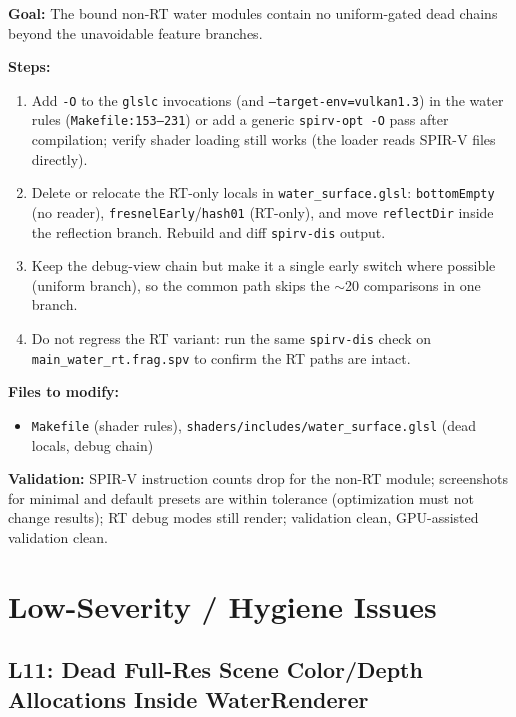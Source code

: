 \documentclass[11pt,a4paper]{article}
\begin{document}
\begin{tcolorbox}[promptbox={Prompt: Optimize the Water Shader Modules and Remove Dead Chains}]
\textbf{Goal:} The bound non-RT water modules contain no uniform-gated dead chains beyond the unavoidable feature branches.

\textbf{Steps:}
\begin{enumerate}
    \item Add \texttt{-O} to the \texttt{glslc} invocations (and \texttt{--target-env=vulkan1.3}) in the water rules (\texttt{Makefile:153--231}) or add a generic
    \texttt{spirv-opt -O} pass after compilation; verify shader loading still works (the loader reads SPIR-V files directly).
    \item Delete or relocate the RT-only locals in \texttt{water\_surface.glsl}: \texttt{bottomEmpty} (no reader), \texttt{fresnelEarly}/\texttt{hash01} (RT-only), and move
    \texttt{reflectDir} inside the reflection branch. Rebuild and diff \texttt{spirv-dis} output.
    \item Keep the debug-view chain but make it a single early switch where possible (uniform branch), so the common path skips the $\sim$20 comparisons in one branch.
    \item Do not regress the RT variant: run the same \texttt{spirv-dis} check on \texttt{main\_water\_rt.frag.spv} to confirm the RT paths are intact.
\end{enumerate}

\textbf{Files to modify:}
\begin{itemize}
    \item \texttt{Makefile} (shader rules), \texttt{shaders/includes/water\_surface.glsl} (dead locals, debug chain)
\end{itemize}

\textbf{Validation:} SPIR-V instruction counts drop for the non-RT module; screenshots for minimal and default presets are within tolerance (optimization must not change
results); RT debug modes still render; validation clean, GPU-assisted validation clean.
\end{tcolorbox}

\section{Low-Severity / Hygiene Issues}

\subsection{L11: Dead Full-Res Scene Color/Depth Allocations Inside WaterRenderer}
\end{document}
